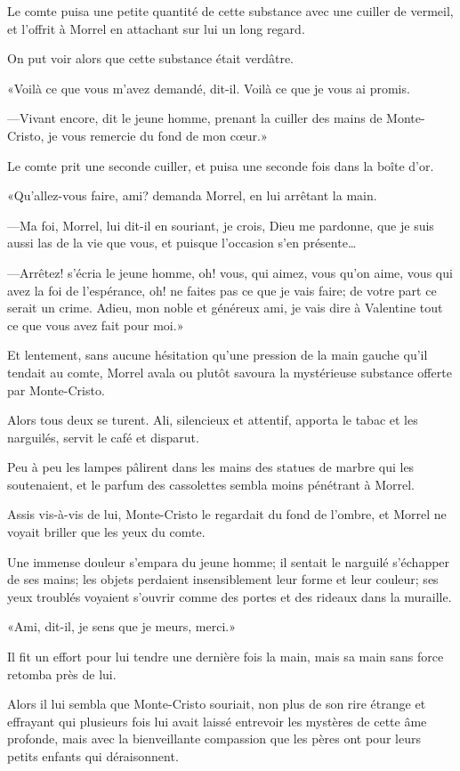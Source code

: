 Le comte puisa une petite quantité de cette substance avec une cuiller de vermeil, et l'offrit à Morrel en attachant sur lui un long regard. 

On put voir alors que cette substance était verdâtre. 

«Voilà ce que vous m'avez demandé, dit-il. Voilà ce que je vous ai promis. 

—Vivant encore, dit le jeune homme, prenant la cuiller des mains de Monte-Cristo, je vous remercie du fond de mon cœur.» 

Le comte prit une seconde cuiller, et puisa une seconde fois dans la boîte d'or. 

«Qu'allez-vous faire, ami? demanda Morrel, en lui arrêtant la main. 

—Ma foi, Morrel, lui dit-il en souriant, je crois, Dieu me pardonne, que je suis aussi las de la vie que vous, et puisque l'occasion s'en présente\dots 

—Arrêtez! s'écria le jeune homme, oh! vous, qui aimez, vous qu'on aime, vous qui avez la foi de l'espérance, oh! ne faites pas ce que je vais faire; de votre part ce serait un crime. Adieu, mon noble et généreux ami, je vais dire à Valentine tout ce que vous avez fait pour moi.» 

Et lentement, sans aucune hésitation qu'une pression de la main gauche qu'il tendait au comte, Morrel avala ou plutôt savoura la mystérieuse substance offerte par Monte-Cristo. 

Alors tous deux se turent. Ali, silencieux et attentif, apporta le tabac et les narguilés, servit le café et disparut. 

Peu à peu les lampes pâlirent dans les mains des statues de marbre qui les soutenaient, et le parfum des cassolettes sembla moins pénétrant à Morrel. 

Assis vis-à-vis de lui, Monte-Cristo le regardait du fond de l'ombre, et Morrel ne voyait briller que les yeux du comte. 

Une immense douleur s'empara du jeune homme; il sentait le narguilé s'échapper de ses mains; les objets perdaient insensiblement leur forme et leur couleur; ses yeux troublés voyaient s'ouvrir comme des portes et des rideaux dans la muraille. 

«Ami, dit-il, je sens que je meurs, merci.» 

Il fit un effort pour lui tendre une dernière fois la main, mais sa main sans force retomba près de lui. 

Alors il lui sembla que Monte-Cristo souriait, non plus de son rire étrange et effrayant qui plusieurs fois lui avait laissé entrevoir les mystères de cette âme profonde, mais avec la bienveillante compassion que les pères ont pour leurs petits enfants qui déraisonnent. 


